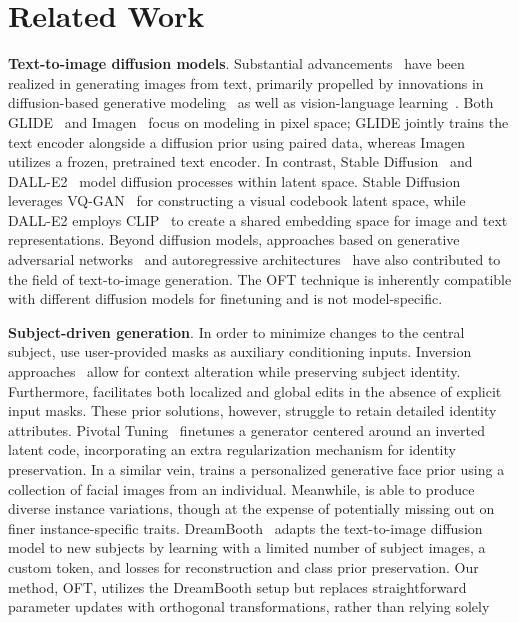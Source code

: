 \section{Related Work}

\textbf{Text-to-image diffusion models}. Substantial advancements~\cite{saharia2022photorealistic,ramesh2022hierarchical,rombach2022high,gu2022vector,nichol2022glide} have been realized in generating images from text, primarily propelled by innovations in diffusion-based generative modeling~\cite{ho2020denoising,song2021score,song2021denoising,dhariwal2021diffusion} as well as vision-language learning~\cite{su2020vlbert,lu2019vilbert,radford2021learning,wang2021simvlm,li2022blip,li2023blip,alayrac2022flamingo,schuhmann2022laion}. Both GLIDE~\cite{nichol2022glide} and Imagen~\cite{saharia2022photorealistic} focus on modeling in pixel space; GLIDE jointly trains the text encoder alongside a diffusion prior using paired data, whereas Imagen utilizes a frozen, pretrained text encoder. In contrast, Stable Diffusion~\cite{rombach2022high} and DALL-E2~\cite{ramesh2022hierarchical} model diffusion processes within latent space. Stable Diffusion leverages VQ-GAN~\cite{esser2021taming} for constructing a visual codebook latent space, while DALL-E2 employs CLIP~\cite{radford2021learning} to create a shared embedding space for image and text representations. Beyond diffusion models, approaches based on generative adversarial networks~\cite{reed2016generative,zhang2017stackgan,xu2018attngan,li2019controllable} and autoregressive architectures~\cite{ramesh2021zero,ding2021cogview,wu2022nuwa,yuscaling} have also contributed to the field of text-to-image generation. The OFT technique is inherently compatible with different diffusion models for finetuning and is not model-specific.

\textbf{Subject-driven generation}. In order to minimize changes to the central subject, \cite{avrahami2022blended,nichol2022glide} use user-provided masks as auxiliary conditioning inputs. Inversion approaches~\cite{choi2021ilvr,dhariwal2021diffusion,ramesh2022hierarchical,gal2022image} allow for context alteration while preserving subject identity. Furthermore, \cite{hertz2022prompt} facilitates both localized and global edits in the absence of explicit input masks. These prior solutions, however, struggle to retain detailed identity attributes. Pivotal Tuning~\cite{roich2022pivotal} finetunes a generator centered around an inverted latent code, incorporating an extra regularization mechanism for identity preservation. In a similar vein, \cite{nitzan2022mystyle} trains a personalized generative face prior using a collection of facial images from an individual. Meanwhile, \cite{casanova2021instance} is able to produce diverse instance variations, though at the expense of potentially missing out on finer instance-specific traits. DreamBooth~\cite{ruiz2023dreambooth} adapts the text-to-image diffusion model to new subjects by learning with a limited number of subject images, a custom token, and losses for reconstruction and class prior preservation. Our method, OFT, utilizes the DreamBooth setup but replaces straightforward parameter updates with orthogonal transformations, rather than relying solely

